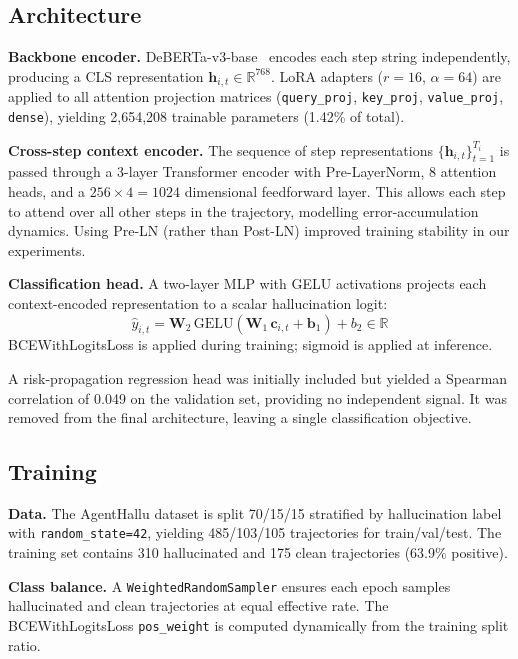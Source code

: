 \documentclass[11pt]{article}
\begin{document}
\subsection{Architecture}

\textbf{Backbone encoder.} DeBERTa-v3-base~\citep{deberta} encodes each step string independently, producing a CLS representation $\mathbf{h}_{i,t} \in \mathbb{R}^{768}$. LoRA adapters ($r{=}16$, $\alpha{=}64$) are applied to all attention projection matrices (\texttt{query\_proj}, \texttt{key\_proj}, \texttt{value\_proj}, \texttt{dense}), yielding 2,654,208 trainable parameters (1.42\% of total).

\textbf{Cross-step context encoder.} The sequence of step representations $\{\mathbf{h}_{i,t}\}_{t=1}^{T_i}$ is passed through a 3-layer Transformer encoder with Pre-LayerNorm, 8 attention heads, and a $256 \times 4 = 1024$ dimensional feedforward layer. This allows each step to attend over all other steps in the trajectory, modelling error-accumulation dynamics. Using Pre-LN (rather than Post-LN) improved training stability in our experiments.

\textbf{Classification head.} A two-layer MLP with GELU activations projects each context-encoded representation to a scalar hallucination logit:
\begin{equation}
  \hat{y}_{i,t} = \mathbf{W}_2\,\text{GELU}(\mathbf{W}_1\,\mathbf{c}_{i,t} + \mathbf{b}_1) + b_2 \in \mathbb{R}
\end{equation}
BCEWithLogitsLoss is applied during training; sigmoid is applied at inference.

A risk-propagation regression head was initially included but yielded a Spearman correlation of 0.049 on the validation set, providing no independent signal. It was removed from the final architecture, leaving a single classification objective.

\subsection{Training}

\textbf{Data.} The AgentHallu dataset is split 70/15/15 stratified by hallucination label with \texttt{random\_state=42}, yielding 485/103/105 trajectories for train/val/test. The training set contains 310 hallucinated and 175 clean trajectories (63.9\% positive).

\textbf{Class balance.} A \texttt{WeightedRandomSampler} ensures each epoch samples hallucinated and clean trajectories at equal effective rate. The BCEWithLogitsLoss \texttt{pos\_weight} is computed dynamically from the training split ratio.
\end{document}
